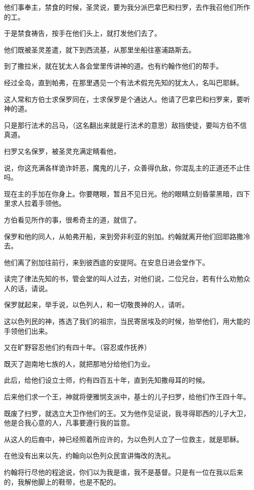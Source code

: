 \documentclass[12pt,oneside]{book}
\begin{document}
他们事奉主，禁食的时候，圣灵说，要为我分派巴拿巴和扫罗，去作我召他们所作的工。

于是禁食祷告，按手在他们头上，就打发他们去了。

他们既被圣灵差遣，就下到西流基，从那里坐船往塞浦路斯去。

到了撒拉米，就在犹太人各会堂里传讲神的道。也有约翰作他们的帮手。

经过全岛，直到帕弗，在那里遇见一个有法术假充先知的犹太人，名叫巴耶稣。

这人常和方伯士求保罗同在，士求保罗是个通达人。他请了巴拿巴和扫罗来，要听神的道。

只是那行法术的吕马，（这名翻出来就是行法术的意思）敌挡使徒，要叫方伯不信真道。

扫罗又名保罗，被圣灵充满定睛看他，

说，你这充满各样诡诈奸恶，魔鬼的儿子，众善得仇敌，你混乱主的正道还不止住吗。

现在主的手加在你身上。你要瞎眼，暂且不见日光。他的眼睛立刻昏蒙黑暗，四下里求人拉着手领他。

方伯看见所作的事，很希奇主的道，就信了。

保罗和他的同人，从帕弗开船，来到旁非利亚的别加。约翰就离开他们回耶路撒冷去。

他们离了别加往前行，来到彼西底的安提阿。在安息日进会堂作下。

读完了律法先知的书，管会堂的叫人过去，对他们说，二位兄台，若有什么劝勉众人的话，请说。

保罗就起来，举手说，以色列人，和一切敬畏神的人，请听。

这以色列民的神，拣选了我们的祖宗，当民寄居埃及的时候，抬举他们，用大能的手领他们出来。

又在旷野容忍他们约有四十年。（容忍或作抚养）

既灭了迦南地七族的人，就把那地分给他们为业。

此后，给他们设立士师，约有四百五十年，直到先知撒母耳的时候。

后来他们求一个王，神就将便雅悯支派中，基士的儿子扫罗，给他们作王四十年。

既废了扫罗，就选立大卫作他们的王。又为他作见证说，我寻得耶西的儿子大卫，他是合我心意的人，凡事要遵行我的旨意。

从这人的后裔中，神已经照着所应许的，为以色列人立了一位救主，就是耶稣。

在他没有出来以先，约翰向以色列众民宣讲悔改的洗礼。

约翰将行尽他的程途说，你们以为我是谁，我不是基督。只是有一位在我以后来的，我解他脚上的鞋带，也是不配的。
\end{document}
